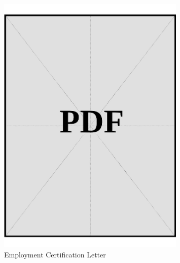 \begin{figure}[ht]
  \centering
  \includegraphics[page=1, width=0.8\textwidth]{../application-docs/applicant/employment/company-2/employment-letter.pdf}
  \caption{Employment Certification Letter}
  \label{pdf:company-2-certification-letter}
\end{figure}

\clearpage